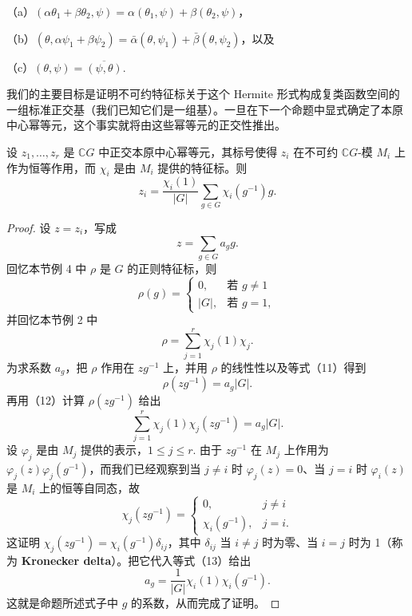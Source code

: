 （a）\((\alpha\theta_1+\beta\theta_2, \psi) = \alpha(\theta_1, \psi)+\beta(\theta_2, \psi)\)，

（b）\((\theta, \alpha\psi_1+\beta\psi_2) = \bar\alpha(\theta, \psi_1)+\bar\beta(\theta, \psi_2)\)，以及

（c）\((\theta, \psi) = \overline{(\psi, \theta)}\).

我们的主要目标是证明不可约特征标关于这个 Hermite 形式构成复类函数空间的一组标准正交基（我们已知它们是一组基）。一旦在下一个命题中显式确定了本原中心幂等元，这个事实就将由这些幂等元的正交性推出。

\begin{proposition}\label{pro:18.13}
设 \(z_1, \ldots, z_r\) 是 \(\mathbb{C}G\) 中正交本原中心幂等元，其标号使得 \(z_i\) 在不可约 \(\mathbb{C}G\)-模 \(M_i\) 上作为恒等作用，而 \(\chi_i\) 是由 \(M_i\) 提供的特征标。则
\[
z_i = \frac{\chi_i(1)}{|G|}\sum_{g \in G}\chi_i(g^{-1})g.
\]
\end{proposition}

\begin{proof}
设 \(z = z_i\)，写成
\[
z = \sum_{g \in G}a_gg.
\]
回忆本节例 4 中 \(\rho\) 是 \(G\) 的正则特征标，则
\[
\rho(g) = \begin{cases}0, & \text{若 } g \neq 1\\ |G|, & \text{若 } g = 1,\end{cases} \tag{18.11}
\]
并回忆本节例 2 中
\[
\rho = \sum_{j=1}^{r}\chi_j(1)\chi_j. \tag{18.12}
\]
为求系数 \(a_g\)，把 \(\rho\) 作用在 \(zg^{-1}\) 上，并用 \(\rho\) 的线性性以及等式（11）得到
\[
\rho(zg^{-1}) = a_g|G|.
\]
再用（12）计算 \(\rho(zg^{-1})\) 给出
\[
\sum_{j=1}^{r}\chi_j(1)\chi_j(zg^{-1}) = a_g|G|. \tag{18.13}
\]
设 \(\varphi_j\) 是由 \(M_j\) 提供的表示，\(1 \leq j \leq r\). 由于 \(zg^{-1}\) 在 \(M_j\) 上作用为 \(\varphi_j(z)\varphi_j(g^{-1})\)，而我们已经观察到当 \(j \neq i\) 时 \(\varphi_j(z) = 0\)、当 \(j = i\) 时 \(\varphi_i(z)\) 是 \(M_i\) 上的恒等自同态，故
\[
\chi_j(zg^{-1}) = \begin{cases}0, & j \neq i\\ \chi_i(g^{-1}), & j = i.\end{cases}
\]
这证明 \(\chi_j(zg^{-1}) = \chi_i(g^{-1})\delta_{ij}\)，其中 \(\delta_{ij}\) 当 \(i \neq j\) 时为零、当 \(i = j\) 时为 1（称为 \textbf{Kronecker delta}）。把它代入等式（13）给出
\[
a_g = \frac{1}{|G|}\chi_i(1)\chi_i(g^{-1}).
\]
这就是命题所述式子中 \(g\) 的系数，从而完成了证明。
\end{proof}

